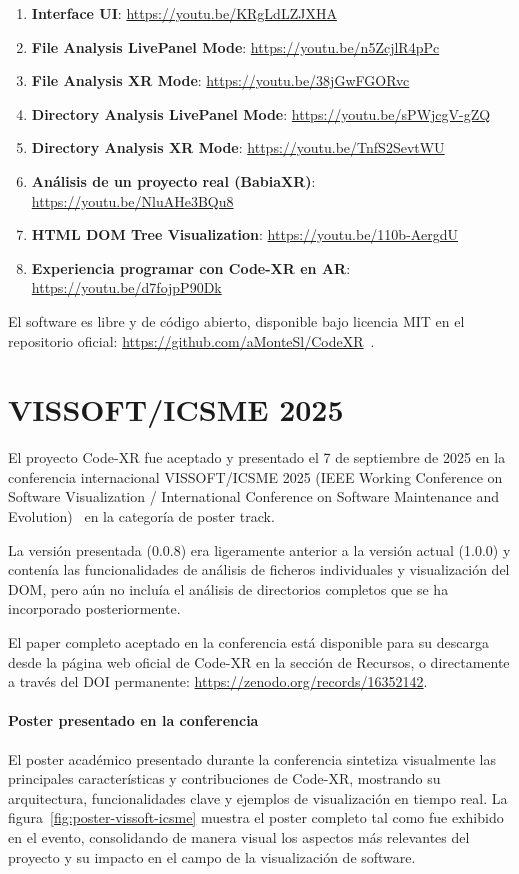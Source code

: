 \documentclass[a4paper, 12pt]{book}
\begin{document}
\begin{enumerate}
  \item \textbf{Interface UI}: \url{https://youtu.be/KRgLdLZJXHA}
  \item \textbf{File Analysis LivePanel Mode}: \url{https://youtu.be/n5ZcjlR4pPc}
  \item \textbf{File Analysis XR Mode}: \url{https://youtu.be/38jGwFGORvc}
  \item \textbf{Directory Analysis LivePanel Mode}: \url{https://youtu.be/sPWjcgV-gZQ}
  \item \textbf{Directory Analysis XR Mode}: \url{https://youtu.be/TnfS2SevtWU}
  \item \textbf{Análisis de un proyecto real (BabiaXR)}: \url{https://youtu.be/NluAHe3BQu8}
  \item \textbf{HTML DOM Tree Visualization}: \url{https://youtu.be/110b-AergdU}
  \item \textbf{Experiencia programar con Code-XR en AR}: \url{https://youtu.be/d7fojpP90Dk}
\end{enumerate}

El software es libre y de código abierto, disponible bajo licencia MIT en el repositorio oficial: \url{https://github.com/aMonteSl/CodeXR}~\cite{code-xr}.

\section{VISSOFT/ICSME 2025}
\label{sec:vissoft-icsme}

El proyecto Code-XR fue aceptado y presentado el 7 de septiembre de 2025 en la conferencia internacional VISSOFT/ICSME 2025  (IEEE Working Conference on Software Visualization / International Conference on Software Maintenance and Evolution)~\cite{vissoft2025} en la categoría de poster track.

La versión presentada (0.0.8) era ligeramente anterior a la versión actual (1.0.0) y contenía las funcionalidades de análisis de ficheros individuales y visualización del DOM, pero aún no incluía el análisis de directorios completos que se ha incorporado posteriormente.

El paper completo aceptado en la conferencia está disponible para su descarga desde la página web oficial de Code-XR en la sección de Recursos, o directamente a través del DOI permanente: \url{https://zenodo.org/records/16352142}.

\paragraph{Poster presentado en la conferencia}
El poster académico presentado durante la conferencia sintetiza visualmente las principales características y contribuciones de Code-XR, mostrando su arquitectura, funcionalidades clave y ejemplos de visualización en tiempo real. La figura~\ref{fig:poster-vissoft-icsme} muestra el poster completo tal como fue exhibido en el evento, consolidando de manera visual los aspectos más relevantes del proyecto y su impacto en el campo de la visualización de software.
\end{document}
